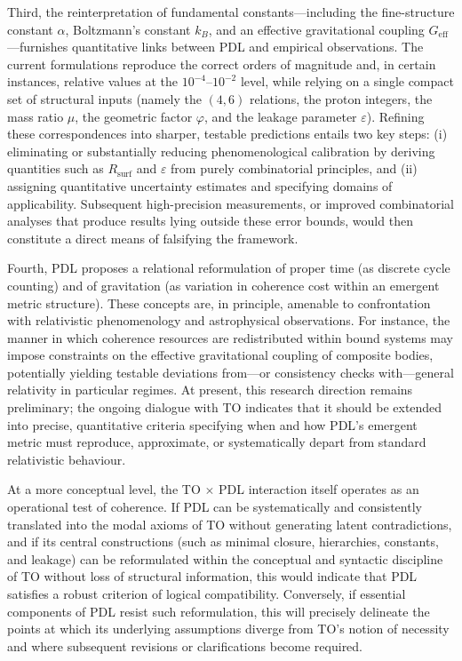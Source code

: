 \documentclass[11pt,a4paper]{article}
\begin{document}
Third, the reinterpretation of fundamental constants—including the fine-structure constant \(\alpha\), Boltzmann’s constant \(k_B\), and an effective gravitational coupling \(G_{\text{eff}}\)—furnishes quantitative links between PDL and empirical observations. The current formulations reproduce the correct orders of magnitude and, in certain instances, relative values at the \(10^{-4}\)–\(10^{-2}\) level, while relying on a single compact set of structural inputs (namely the \((4,6)\) relations, the proton integers, the mass ratio \(\mu\), the geometric factor \(\varphi\), and the leakage parameter \(\varepsilon\)). Refining these correspondences into sharper, testable predictions entails two key steps: (i) eliminating or substantially reducing phenomenological calibration by deriving quantities such as \(R_{\text{surf}}\) and \(\varepsilon\) from purely combinatorial principles, and (ii) assigning quantitative uncertainty estimates and specifying domains of applicability. Subsequent high-precision measurements, or improved combinatorial analyses that produce results lying outside these error bounds, would then constitute a direct means of falsifying the framework.

Fourth, PDL proposes a relational reformulation of proper time (as discrete cycle counting) and of gravitation (as variation in coherence cost within an emergent metric structure). These concepts are, in principle, amenable to confrontation with relativistic phenomenology and astrophysical observations. For instance, the manner in which coherence resources are redistributed within bound systems may impose constraints on the effective gravitational coupling of composite bodies, potentially yielding testable deviations from—or consistency checks with—general relativity in particular regimes. At present, this research direction remains preliminary; the ongoing dialogue with TO indicates that it should be extended into precise, quantitative criteria specifying when and how PDL’s emergent metric must reproduce, approximate, or systematically depart from standard relativistic behaviour.

At a more conceptual level, the TO $\times$ PDL interaction itself operates as an operational test of coherence. If PDL can be systematically and consistently translated into the modal axioms of TO without generating latent contradictions, and if its central constructions (such as minimal closure, hierarchies, constants, and leakage) can be reformulated within the conceptual and syntactic discipline of TO without loss of structural information, this would indicate that PDL satisfies a robust criterion of logical compatibility. Conversely, if essential components of PDL resist such reformulation, this will precisely delineate the points at which its underlying assumptions diverge from TO’s notion of necessity and where subsequent revisions or clarifications become required. 
\end{document}
